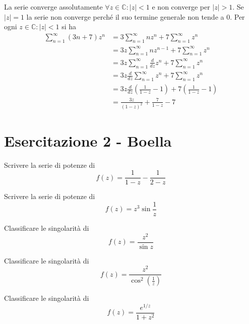 La serie converge assolutamente $\forall z\in \mathbb{C} :\left| z\right| < 1$ e non converge per $\left| z\right|  >1$. Se $\left| z\right| =1$ la serie non converge perché il suo termine generale non tende a $0$. Per ogni $z\in \mathbb{C} :\left| z\right| < 1$ si ha
\begin{align*}
\sum\limits ^{\infty }_{n=1}\left( 3n+7\right) z^{n} & =3\sum\limits ^{\infty }_{n=1} nz^{n} +7\sum\limits ^{\infty }_{n=1} z^{n}\\
 & =3z\sum\limits ^{\infty }_{n=1} nz^{n-1} +7\sum\limits ^{\infty }_{n=1} z^{n}\\
 & =3z\sum\limits ^{\infty }_{n=1}\frac{d}{dz} z^{n} +7\sum\limits ^{\infty }_{n=1} z^{n}\\
 & =3z\frac{d}{dz}\sum\limits ^{\infty }_{n=1} z^{n} +7\sum\limits ^{\infty }_{n=1} z^{n}\\
 & =3z\frac{d}{dz}\left(\frac{1}{1-z} -1\right) +7\left(\frac{1}{1-z} -1\right)\\
 & =\frac{3z}{\left( 1-z\right)^{2}} +\frac{7}{1-z} -7
\end{align*}
\chapter{Esercitazione 2 - Boella}
\ParteEsercizi
\Esercizio{}

Scrivere la serie di potenze di
\begin{equation*}
f\left( z\right) =\frac{1}{1-z} -\frac{1}{2-z}
\end{equation*}
\Esercizio{}

Scrivere la serie di potenze di
\begin{equation*}
f\left( z\right) =z^{3}\sin\frac{1}{z}
\end{equation*}
\Esercizio{}

Classificare le singolarità di
\begin{equation*}
f\left( z\right) =\frac{z^{2}}{\sin z}
\end{equation*}
\Esercizio{}

Classificare le singolarità di
\begin{equation*}
f\left( z\right) =\frac{z^{2}}{\cos^{2}\left(\frac{1}{z}\right)}
\end{equation*}
\Esercizio{}

Classificare le singolarità di
\begin{equation*}
f\left( z\right) =\frac{e^{1/z}}{1+z^{2}}
\end{equation*}

